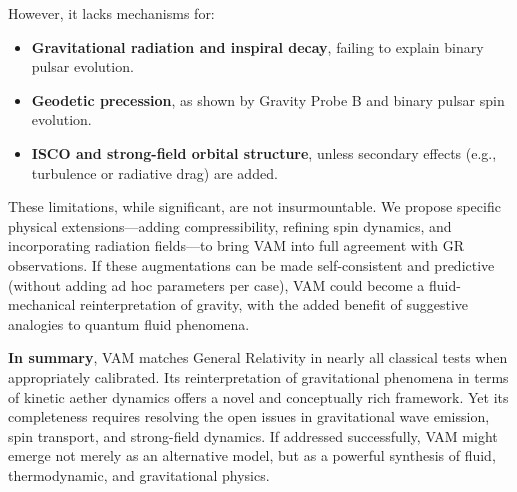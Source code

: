 However, it lacks mechanisms for:

\begin{itemize}
    \item \textbf{Gravitational radiation and inspiral decay}, failing to explain binary pulsar evolution.
    \item \textbf{Geodetic precession}, as shown by Gravity Probe B and binary pulsar spin evolution.
    \item \textbf{ISCO and strong-field orbital structure}, unless secondary effects (e.g., turbulence or radiative drag) are added.
\end{itemize}

These limitations, while significant, are not insurmountable. We propose specific physical extensions—adding compressibility, refining spin dynamics, and incorporating radiation fields—to bring VAM into full agreement with GR observations. If these augmentations can be made self-consistent and predictive (without adding ad hoc parameters per case), VAM could become a fluid-mechanical reinterpretation of gravity, with the added benefit of suggestive analogies to quantum fluid phenomena.

\textbf{In summary}, VAM matches General Relativity in nearly all classical tests when appropriately calibrated. Its reinterpretation of gravitational phenomena in terms of kinetic aether dynamics offers a novel and conceptually rich framework. Yet its completeness requires resolving the open issues in gravitational wave emission, spin transport, and strong-field dynamics. If addressed successfully, VAM might emerge not merely as an alternative model, but as a powerful synthesis of fluid, thermodynamic, and gravitational physics.